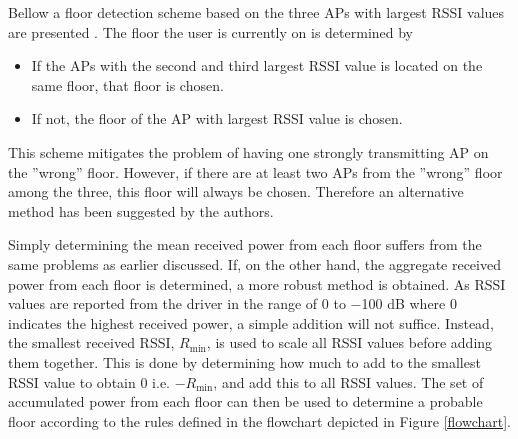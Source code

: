\documentclass{LTHthesis}
\begin{document}
Bellow a floor detection scheme based on the three APs with largest RSSI values are presented \cite{floor_det}. The floor the user is currently on is determined by 
%
\begin{itemize}
\item If the APs with the second and third largest RSSI value is located on the same floor, that floor is chosen.
\item If not, the floor of the AP with largest RSSI value is chosen.   
\end{itemize}      
%
This scheme mitigates the problem of having one strongly transmitting AP on the ''wrong'' floor. However, if there are at least two APs from the ''wrong'' floor among the three, this floor will always be chosen. Therefore an alternative method has been suggested by the authors. 

Simply determining the mean received power from each floor suffers from the same problems as earlier discussed. If, on the other hand, the aggregate received power from each floor is determined, a more robust method is obtained. As RSSI values are reported from the driver in the range of 0 to $-$100 dB where 0 indicates the highest received power, a simple addition will not suffice. Instead, the smallest received RSSI, $R_{\mbox{min}}$, is used to scale all RSSI values before adding them together. This is done by determining how much to add to the smallest RSSI value to obtain $0$ i.e. $-R_{\mbox{min}} $, and add this to all RSSI values. The set of accumulated power from each floor can then be used to determine a probable floor according to the rules defined in the flowchart depicted in Figure \ref{flowchart}.
\end{document}
